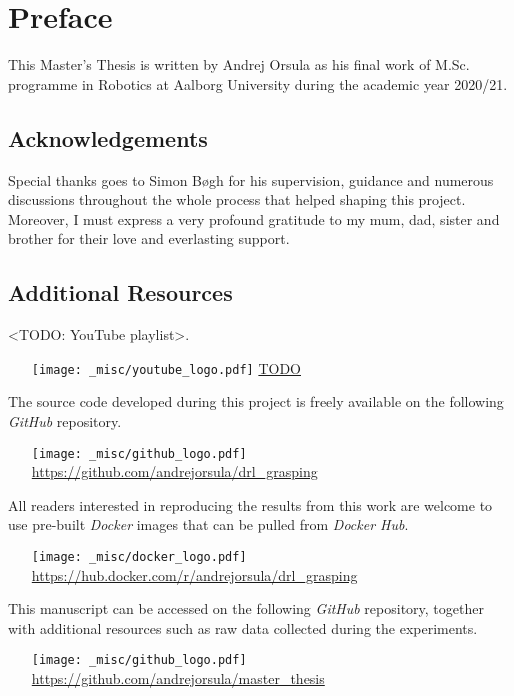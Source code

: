 \chapter*{Preface}

This Master’s Thesis is written by Andrej Orsula as his final work of M.Sc. programme in Robotics at Aalborg University during the academic year 2020/21.


\section*{Acknowledgements}

Special thanks goes to Simon Bøgh for his supervision, guidance and numerous discussions throughout the whole process that helped shaping this project.
Moreover, I must express a very profound gratitude to my mum, dad, sister and brother for their love and everlasting support.


\section*{Additional Resources}

\noindent
<TODO: YouTube playlist>.
\begin{itemize}
    \item[{\texttt{[image: \_misc/youtube\_logo.pdf]}}] \href{TODO}{TODO}
\end{itemize}

\noindent
The source code developed during this project is freely available on the following \textit{GitHub} repository.
\begin{itemize}
    \item[{\texttt{[image: \_misc/github\_logo.pdf]}}] \href{https://github.com/andrejorsula/drl_grasping}{https://github.com/andrejorsula/drl\_grasping}
\end{itemize}

\noindent
All readers interested in reproducing the results from this work are welcome to use pre-built \textit{Docker} images that can be pulled from \textit{Docker Hub}.
\begin{itemize}
    \item[{\texttt{[image: \_misc/docker\_logo.pdf]}}] \href{https://hub.docker.com/r/andrejorsula/drl_grasping}{https://hub.docker.com/r/andrejorsula/drl\_grasping}
\end{itemize}

\noindent
This manuscript can be accessed on the following \textit{GitHub} repository, together with additional resources such as raw data collected during the experiments.
\begin{itemize}
    \item[{\texttt{[image: \_misc/github\_logo.pdf]}}] \href{https://github.com/andrejorsula/master_thesis}{https://github.com/andrejorsula/master\_thesis}
\end{itemize}
